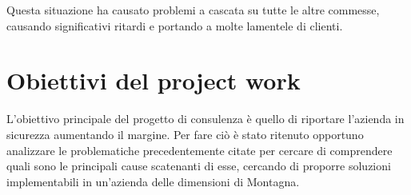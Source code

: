 \begin{multicols}{2}
  Questa situazione ha causato problemi a cascata su tutte le altre commesse, causando significativi ritardi e portando a molte lamentele di clienti. 

\section{Obiettivi del project work}
	L’obiettivo principale del progetto di consulenza è quello di riportare l’azienda in sicurezza aumentando il margine. Per fare ciò è stato ritenuto opportuno analizzare le problematiche precedentemente citate per cercare di comprendere quali sono le principali cause scatenanti di esse, cercando di proporre soluzioni implementabili in un’azienda delle dimensioni di Montagna.
\end{multicols}
